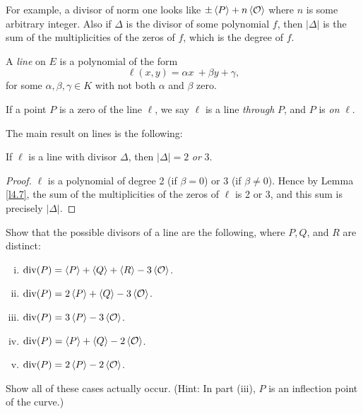 For example, a divisor of norm one looks like $\pm\left\langle P \right \rangle+n\left\langle \mathcal{O} \right \rangle$ where $n$ is some arbitrary integer. Also if $\Delta$ is the divisor of some polynomial $f$, then $|\Delta|$ is the sum of the multiplicities of the zeros of $f$, which is the degree of $f$.

\begin{defi}
\label{d5.10}
A {\it line} on $E$ is a polynomial of the form
$$
\ell(x, y)=\alpha x\ +\beta y+\gamma,
$$
for some $\alpha, \beta,\gamma\in K$ with not both $\alpha$ and $\beta$ zero.
\end{defi}

If a point $P$ is a zero of the line $\ell$, we say $\ell$ is a line {\it through} $P$, and $P$ is {\it on} $\ell$.

The main result on lines is the following:

\begin{lem}
\label{l5.11}
If $\ell$ is a line with divisor $\Delta$, then $|\Delta|=2$ {\it or} 3.
\end{lem}

\begin{proof} $\ell$ is a polynomial of degree 2 (if $\beta=0$) or 3 (if $\beta\neq 0$). Hence by Lemma \ref{l4.7}, the sum of the multiplicities of the zeros of $\ell$ is 2 or 3, and this sum is precisely $|\Delta|$.
\end{proof}

\begin{exo}
\label{e5.12}
Show that the possible divisors of a line are the following, where $P,Q$, and $R$ are distinct:

\begin{enumerate}[(i)]
\item
$\operatorname{div}(P)=\left\langle P \right \rangle + \left\langle Q \right \rangle + \left\langle R \right \rangle - 3\left\langle \mathcal{O} \right \rangle$.
\item
$\operatorname{div}(P)=2\left\langle P \right \rangle+\left\langle Q \right \rangle-3\left\langle \mathcal{O} \right \rangle$.
\item
$\operatorname{div}(P)=3\left\langle P \right \rangle-3\left\langle \mathcal{O} \right \rangle$.
\item
$\operatorname{div}(P)=\left\langle P \right \rangle+\left\langle Q \right \rangle-2\left\langle \mathcal{O} \right \rangle$.
\item
$\operatorname{div}(P)=2\left\langle P \right \rangle-2\left\langle \mathcal{O} \right \rangle$.
\end{enumerate}
\end{exo}

Show all of these cases actually occur. (Hint: In part (iii), $P$ is an inflection point of the curve.)

